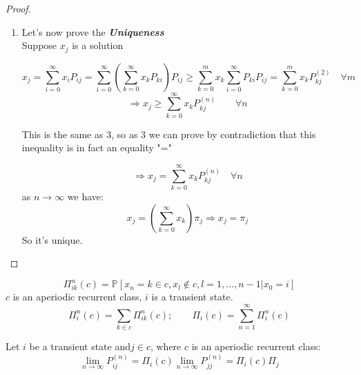 \begin{proof}
\begin{enumerate}
\item
Let's now prove the \textbf{\textit{Uniqueness}} \\
Suppose $x_j$ is a solution

$$x_j =
 \sum_{i=0}^\infty x_i P_{ij} =
 \sum_{i=0}^\infty ( \sum_{k=0}^\infty x_k P_{ki} ) P_{ij} \geq
 \sum_{k=0}^m x_k \sum_{i=0}^\infty P_{ki} P_{ij} = 
 \sum_{k=0}^m x_k P_{kj}^{(2)}
 \quad \forall m            
$$
$$ \Rightarrow x_j \geq \sum_{k=0}^\infty x_k P_{kj}^{(n)}\qquad \forall n $$

This is the same as 3, so as 3 we can prove by contradiction that this inequality is in fact an equality "="

$$\Rightarrow x_j = \sum_{k=0}^\infty x_k P_{kj}^{(n)} \quad \forall n$$
as $n \to \infty$ we have:
\begin{equation}
x_j = (\sum_{k=0}^\infty x_k ) \pi_j \Rightarrow x_j = \pi_j
\end{equation}
So it's unique.

\end{enumerate}
\end{proof}



\begin{definition}[lezione 22/03/17]
$$\Pi_{ik}^n(c) = \mathbb{P}[x_n = k \in c, x_l \notin c, l=1, ... , n-1 | x_0 =i]$$
$c$ is an aperiodic recurrent class, $i$ is a transient state. 
$$\Pi_i^n(c) = \sum_{k \in c} \Pi_{ik}^n(c); \qquad \Pi_i(c) = \sum_{n=1}^\infty \Pi_i^n(c)$$
\end{definition}

\begin{theorem}
Let $i$ be a transient state and$j \in c$, where $c$ is an aperiodic recurrent class:
$$\lim_{n\to\infty} P_{ij}^{(n)} = \Pi_i(c) \lim_{n\to\infty} P_{jj}^{(n)} = \Pi_i(c) \Pi_j$$
\end{theorem}
 






